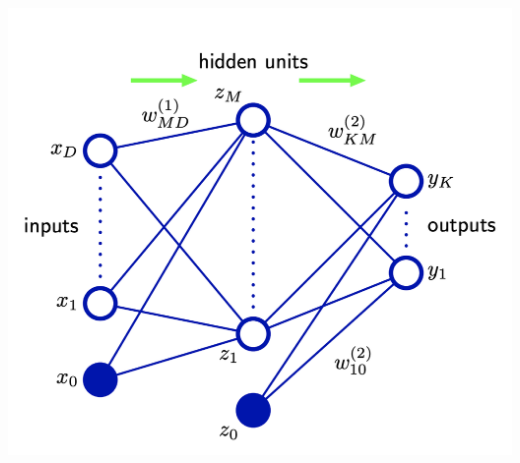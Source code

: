 \documentclass[11pt,a4paper]{jsarticle}
\begin{document}
\includegraphics[scale=0.4]{neuralnet.png}
\end{document}

